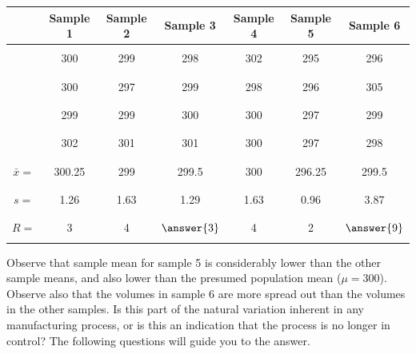 \documentclass{ximera}
\begin{document}
\begin{center}
\begin{tabular}{|c|c|c|c|c|c|c|}
& Sample 1 & Sample 2 & Sample 3 & Sample 4 & Sample 5 & Sample 6  \\
 \hline
 \hline
   & & & & & &\\
 &300 & 299 & 298 & 302 & 295 &296 \\
  & & & & & &\\
  & & & & & &\\
 &300 & 297 & 299 & 298 & 296 & 305\\
  & & & & & &\\
 & & & & & &\\
 &299 & 299 & 300 & 300 & 297 & 299 \\
  & & & & & &\\
  & & & & & &\\
 &302 & 301  & 301 & 300 &297 & 298 \\
  & & & & & &\\
 \hline
 \hline
  & & & & & &\\
 $\bar{x}=$ & 300.25 & 299  & 299.5 & 300 & 296.25 & 299.5 \\
  & & & & & &\\
  \hline
  & & & & & &\\
 $s=$ & 1.26 & 1.63  & 1.29 & 1.63 & 0.96 & 3.87 \\
  & & & & & &\\
 \hline
   & & & & & &\\
 $R=$ & 3 & 4  & $\answer{3}$ & 4 & 2 & $\answer{9}$ \\
  & & & & & &\\
 \hline
\end{tabular}
\end{center}

Observe that sample mean for sample 5 is considerably lower than the other sample means, and also lower than the presumed population mean ($\mu=300$).  Observe also that the volumes in sample 6 are more spread out than the volumes in the other samples.  Is this part of the natural variation inherent in any manufacturing process, or is this an indication that the process is no longer in control?  The following questions will guide you to the answer.
\end{document}

